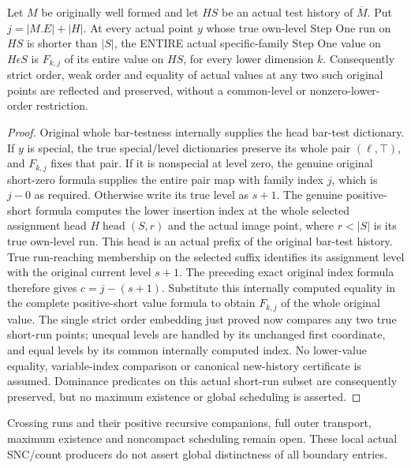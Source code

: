 \begin{theorem}
\label{hir:original-entire-short-step-one-spectrum-order}
\leanok
{}
Let $M$ be originally well formed and let $HS$ be an actual test history of
$\overline M$. Put $j=|M.E|+|H|$. At every actual point $y$ whose true own-level
Step One run on $HS$ is shorter than $|S|$, the ENTIRE actual specific-family
Step One value on $H\epsilon S$ is $F_{k,j}$ of its entire value on $HS$,
for every lower dimension $k$. Consequently strict order, weak order and
equality of actual values at any two such original points are reflected and
preserved, without a common-level or nonzero-lower-order restriction.
\end{theorem}
\begin{proof}
Original whole bar-testness internally supplies the head bar-test dictionary.
If $y$ is special, the true special/level dictionaries preserve its whole pair
$(\ell,\top)$, and $F_{k,j}$ fixes that pair. If it is nonspecial at level zero,
the genuine original short-zero formula supplies the entire pair map with
family index $j$, which is $j-0$ as required. Otherwise write its true level
as $s+1$. The genuine positive-short formula computes the lower insertion
index at the whole selected assignment head $H\operatorname{head}(S,r)$
and the actual image point, where $r<|S|$ is its true own-level run. This head
is an actual prefix of the original bar-test history. True run-reaching
membership on the selected suffix identifies its assignment level with the
original current level $s+1$. The preceding exact original index formula
therefore gives $c=j-(s+1)$. Substitute this internally computed equality in
the complete positive-short value formula to obtain $F_{k,j}$ of the whole
original value. The single strict order embedding just proved now compares
any two true short-run points; unequal levels are handled by its unchanged
first coordinate, and equal levels by its common internally computed index.
No lower-value equality, variable-index comparison or canonical new-history
certificate is assumed. Dominance predicates on this actual short-run subset
are consequently preserved, but no maximum existence or global scheduling is
asserted.
\end{proof}

Crossing runs and their positive recursive companions, full outer transport,
maximum existence and noncompact scheduling remain open. These local actual
SNC/count producers do not assert global distinctness of all boundary entries.
